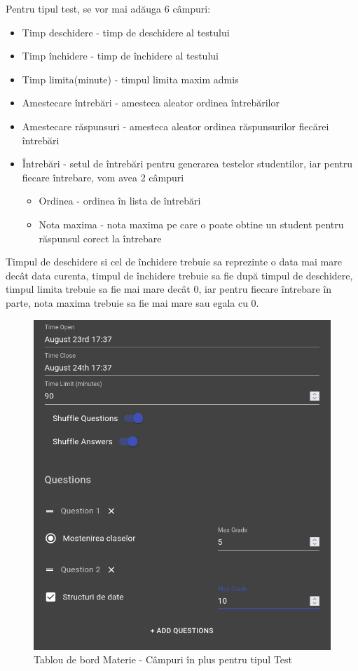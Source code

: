 \documentclass[12pt, a4paper, oneside, romanian]{teza-upb}
\begin{document}
Pentru tipul test, se vor mai adăuga 6 câmpuri:
\begin{itemize}
	\item Timp deschidere - timp de deschidere al testului
	\item Timp închidere - timp de închidere al testului
	\item Timp limita(minute) - timpul limita maxim admis
	\item Amestecare întrebări - amesteca aleator ordinea întrebărilor
	\item Amestecare răspunsuri - amesteca aleator ordinea răspunsurilor fiecărei întrebări
	\item Întrebări - setul de întrebări pentru generarea testelor studentilor, iar pentru fiecare întrebare, vom avea 2 câmpuri
		\begin{itemize}
			\item Ordinea - ordinea în lista de întrebări
			\item Nota maxima - nota maxima pe care o poate obtine un student pentru răspunsul corect la întrebare
		\end{itemize}
\end{itemize}
Timpul de deschidere si cel de închidere trebuie sa reprezinte o data mai mare decât data curenta, timpul de închidere trebuie sa fie după timpul de deschidere, timpul limita trebuie sa fie mai mare decât 0, iar pentru fiecare întrebare în parte, nota maxima trebuie sa fie mai mare sau egala cu 0.

\begin{figure}[H]
\centering
\includegraphics*[width=0.7\columnwidth]{tablou-de-bord-materie-campuri-test}
\caption{Tablou de bord Materie - Câmpuri în plus pentru tipul Test}
\label{tablou-de-bord-materie-campuri-test}
\end{figure}
\end{document}
